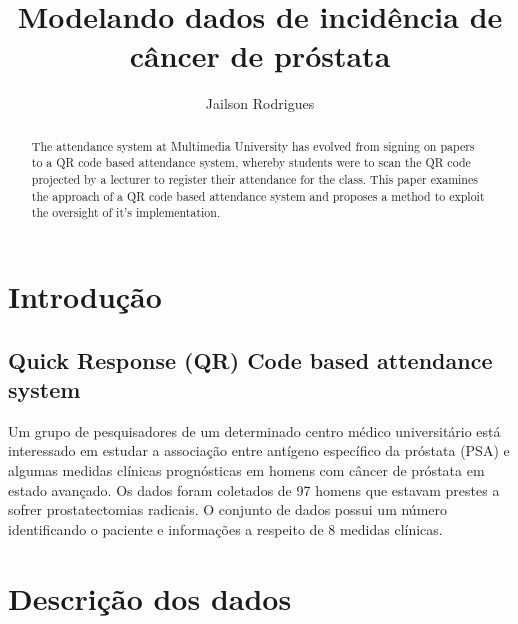 \documentclass[runningheads]{llncs}
\begin{document}
\title{Modelando dados de incidência de câncer de próstata}
%
\author{Jailson Rodrigues}
%
%
%
\maketitle              %
%
\begin{abstract}
The attendance system at Multimedia University has evolved from signing on papers to a QR code based attendance system, whereby students were to scan the QR code projected by a lecturer to register their attendance for the class. This paper examines the approach of a QR code based attendance system and proposes a method to exploit the oversight of it's implementation. 
%
\end{abstract}
%
%
%
\section{Introdução}
\subsection{Quick Response (QR) Code based attendance system}
Um grupo de pesquisadores de um determinado centro médico universitário está interessado em estudar a associação entre antígeno específico da próstata (PSA) e algumas medidas clínicas prognósticas em homens com câncer de próstata em estado avançado. Os dados foram coletados de 97 homens que estavam prestes a sofrer prostatectomias radicais. O conjunto de dados possui um número identificando o paciente e informações a respeito de 8 medidas clínicas.


%
%
\section{Descrição dos dados}
\end{document}
